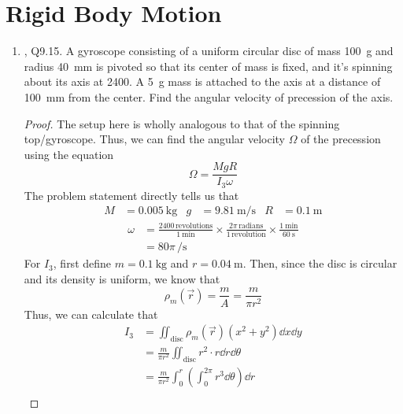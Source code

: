 \documentclass[../psets.tex]{subfiles}
\begin{document}
\section{Rigid Body Motion}
\begin{enumerate}
    \item {}\textcite{bib:KibbleBerkshire}, Q9.15. A gyroscope consisting of a uniform circular disc of mass \SI{100}{\gram} and radius \SI{40}{\milli\meter} is pivoted so that its center of mass is fixed, and it's spinning about its axis at \SI{2400}{\rpm}. A \SI{5}{\gram} mass is attached to the axis at a distance of \SI{100}{\milli\meter} from the center. Find the angular velocity of precession of the axis.
    \begin{proof}
        The setup here is wholly analogous to that of the spinning top/gyroscope. Thus, we can find the angular velocity $\Omega$ of the precession using the equation
        \begin{equation*}
            \Omega = \frac{MgR}{I_3\omega}
        \end{equation*}
        The problem statement directly tells us that
        \begin{align*}
            M &= \SI{0.005}{\kilo\gram}&
            g &= \SI[per-mode=symbol]{9.81}{\meter\per\second}&
            R &= \SI{0.1}{\meter}
        \end{align*}
        \begin{align*}
            \omega &= \frac{2400\,\text{revolutions}}{\SI{1}{\minute}}\times\frac{2\pi\,\text{radians}}{1\,\text{revolution}}\times\frac{\SI{1}{\minute}}{\SI{60}{\second}}\\
            &= 80\pi\,\si{\per\second}
        \end{align*}
        For $I_3$, first define $m=\SI{0.1}{\kilo\gram}$ and $r=\SI{0.04}{\meter}$. Then, since the disc is circular and its density is uniform, we know that
        \begin{equation*}
            \rho_m(\vec{r}) = \frac{m}{A} = \frac{m}{\pi r^2}
        \end{equation*}
        Thus, we can calculate that
        \begin{align*}
            I_3 &= \iint_\text{disc}\rho_m(\vec{r})(x^2+y^2)\dd{x}\dd{y}\\
            &= \frac{m}{\pi r^2}\iint_\text{disc}r^2\cdot r\dd{r}\dd{\theta}\\
            &= \frac{m}{\pi r^2}\int_0^r\left( \int_0^{2\pi}r^3\dd{\theta} \right)\dd{r}\\

\end{align*}
\end{proof}
\end{enumerate}
\end{document}
